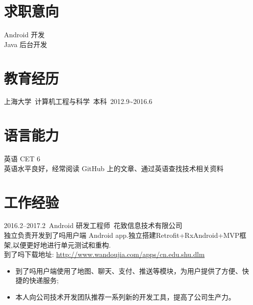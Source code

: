 \documentclass[11pt]{res}
\begin{document}
\address{  beatbox\_gao@hotmail.com\\ GitHub: \url{https://github.com/abcghy} \\ Blog: \url{http://abcghy.github.io}}
\address{上海宝山 \\  18818217393 15502188661}

\begin{resume}

\section{求职意向}
  Android 开发\\    
  Java 后台开发

\section{教育经历}
  上海大学\ 计算机工程与科学\ 本科\ 2012.9\~{}2016.6

\section{语言能力}
  英语 CET 6 \\英语水平良好，经常阅读 GitHub 上的文章、通过英语查找技术相关资料

\section{工作经验}
  2016.2--2017.2\ Android 研发工程师\ 花致信息技术有限公司\\独立负责开发到了吗用户端 Android app.独立搭建Retrofit+RxAndroid+MVP框架,以便更好地进行单元测试和重构.\\到了吗下载地址: \url{http://www.wandoujia.com/apps/cn.edu.shu.dlm}
  \begin{itemize}
    \item 到了吗用户端使用了地图、聊天、支付、推送等模块，为用户提供了方便、快捷的快递服务;
    \item 本人向公司技术开发团队推荐一系列新的开发工具，提高了公司生产力。
  \end{itemize}


\end{resume}
\end{document}
